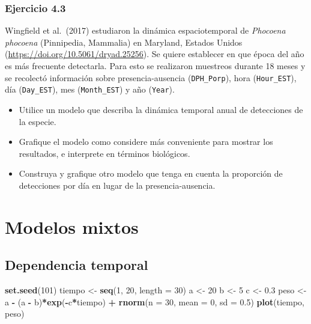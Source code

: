 \documentclass[
]{book}
\newenvironment{Shaded}{\begin{snugshade}}{\end{snugshade}}
\newcommand{\DataTypeTok}[1]{\textcolor[rgb]{0.13,0.29,0.53}{#1}}
\newcommand{\DecValTok}[1]{\textcolor[rgb]{0.00,0.00,0.81}{#1}}
\newcommand{\FloatTok}[1]{\textcolor[rgb]{0.00,0.00,0.81}{#1}}
\newcommand{\KeywordTok}[1]{\textcolor[rgb]{0.13,0.29,0.53}{\textbf{#1}}}
\newcommand{\NormalTok}[1]{#1}
\newcommand{\OperatorTok}[1]{\textcolor[rgb]{0.81,0.36,0.00}{\textbf{#1}}}
\newcommand{\StringTok}[1]{\textcolor[rgb]{0.31,0.60,0.02}{#1}}
\begin{document}
\hypertarget{ejercicio-4.3}{%
\subsection{Ejercicio 4.3}\label{ejercicio-4.3}}

Wingfield et al.~(2017) estudiaron la dinámica espaciotemporal de \emph{Phocoena phocoena} (Pinnipedia, Mammalia) en Maryland, Estados Unidos (\url{https://doi.org/10.5061/dryad.25256}). Se quiere establecer en que época del año es más frecuente detectarla. Para esto se realizaron muestreos durante 18 meses y se recolectó información sobre presencia-ausencia (\texttt{DPH\_Porp}), hora (\texttt{Hour\_EST}), día (\texttt{Day\_EST}), mes (\texttt{Month\_EST}) y año (\texttt{Year}).

\begin{itemize}
\item
  Utilice un modelo que describa la dinámica temporal anual de detecciones de la especie.
\item
  Grafique el modelo como considere más conveniente para mostrar los resultados, e interprete en términos biológicos.
\item
  Construya y grafique otro modelo que tenga en cuenta la proporción de detecciones por día en lugar de la presencia-ausencia.
\end{itemize}

\hypertarget{modelos-mixtos}{%
\chapter{Modelos mixtos}\label{modelos-mixtos}}

\hypertarget{dependencia-temporal}{%
\section{Dependencia temporal}\label{dependencia-temporal}}

\begin{Shaded}
\begin{Highlighting}[]
\KeywordTok{set.seed}\NormalTok{(}\DecValTok{101}\NormalTok{)}
\NormalTok{tiempo <-}\StringTok{ }\KeywordTok{seq}\NormalTok{(}\DecValTok{1}\NormalTok{, }\DecValTok{20}\NormalTok{, }\DataTypeTok{length =} \DecValTok{30}\NormalTok{)}
\NormalTok{a <-}\StringTok{ }\DecValTok{20}
\NormalTok{b <-}\StringTok{ }\DecValTok{5}
\NormalTok{c <-}\StringTok{ }\FloatTok{0.3}
\NormalTok{peso <-}\StringTok{ }\NormalTok{a }\OperatorTok{-}\StringTok{ }\NormalTok{(a }\OperatorTok{-}\StringTok{ }\NormalTok{b)}\OperatorTok{*}\KeywordTok{exp}\NormalTok{(}\OperatorTok{-}\NormalTok{c}\OperatorTok{*}\NormalTok{tiempo) }\OperatorTok{+}\StringTok{ }\KeywordTok{rnorm}\NormalTok{(}\DataTypeTok{n =} \DecValTok{30}\NormalTok{, }\DataTypeTok{mean =} \DecValTok{0}\NormalTok{, }\DataTypeTok{sd =} \FloatTok{0.5}\NormalTok{)}
\KeywordTok{plot}\NormalTok{(tiempo, peso)}
\end{Highlighting}
\end{Shaded}
\end{document}
